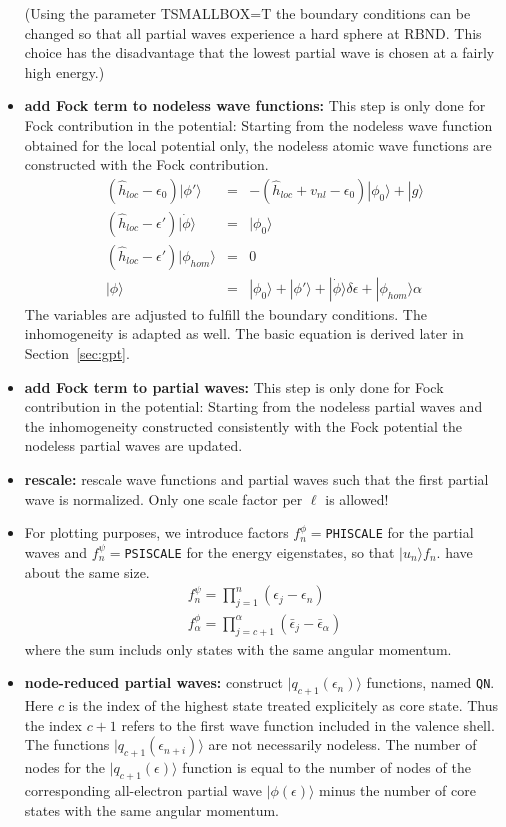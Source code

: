 \documentclass[11pt,a4paper]{report}
\begin{document}
\begin{itemize}
  (Using the parameter TSMALLBOX=T the boundary conditions can be
  changed so that all partial waves experience a hard sphere at
  RBND. This choice has the disadvantage that the lowest partial wave
  is chosen at a fairly high energy.)
%
\item \textbf{add Fock term to nodeless wave functions:} This step is
  only done for Fock contribution in the potential: Starting from the
  nodeless wave function obtained for the local potential only, the
  nodeless atomic wave functions are constructed with the Fock
  contribution.
  \begin{eqnarray*}
  \left(\hat{h}_{loc}-\epsilon_0\right)|\phi'\rangle&=&
  -\left(\hat{h}_{loc}+v_{nl}-\epsilon_0\right)|\phi_0\rangle+|g\rangle
\\
  \left(\hat{h}_{loc}-\epsilon'\right)|\dot{\phi}\rangle&=&|\phi_0\rangle
\\
  \left(\hat{h}_{loc}-\epsilon'\right)|\phi_{hom}\rangle&=&0
\\
|\phi\rangle&=&|\phi_0\rangle+|\phi'\rangle
+|\dot{\phi}\rangle\delta\epsilon+|\phi_{hom}\rangle\alpha
  \end{eqnarray*}
  The variables are adjusted to fulfill the boundary conditions.  The
  inhomogeneity is adapted as well.  The basic equation is derived
  later in Section~\ref{sec:gpt}.
%
\item \textbf{add Fock term to partial waves:} This step is only done
  for Fock contribution in the potential: Starting from the nodeless
  partial waves and the inhomogeneity constructed consistently with
  the Fock potential the nodeless partial waves are updated.
%
\item \textbf{rescale:} rescale wave functions and partial waves such
  that the first partial wave is normalized. Only one scale factor per
  $\ell$ is allowed!
%
\item For plotting purposes, we introduce factors
  $f^\phi_n=$\verb|PHISCALE| for the partial waves and
  $f^\psi_n=$\verb|PSISCALE| for the energy eigenstates, so that
  $|u_n\rangle f_n$. have about the same size.
   \begin{eqnarray*}
    f^{\psi}_n=\prod_{j=1}^n(\epsilon_j-\epsilon_n)
   \\
    f^{\phi}_\alpha=\prod_{j=c+1}^\alpha(\bar{\epsilon}_j-\bar{\epsilon}_\alpha)
  \end{eqnarray*}
   where the sum includs only states with the same angular momentum.
%
\item \textbf{node-reduced partial waves:} construct
  $|q_{c+1}(\epsilon_{n})\rangle$ functions, named \verb|QN|. Here
  $c$ is the index of the highest state treated explicitely as core
  state. Thus the index $c+1$ refers to the first wave function
  included in the valence shell. The functions
  $|q_{c+1}(\epsilon_{n+i})\rangle$ are not necessarily nodeless.  The
  number of nodes for the $|q_{c+1}(\epsilon)\rangle$ function is
  equal to the number of nodes of the corresponding all-electron
  partial wave $|\phi(\epsilon)\rangle$ minus the number of core
  states with the same angular momentum.


\end{itemize}
\end{document}
